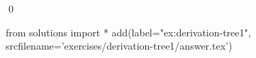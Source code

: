 
\begin{ex} 
  \label{ex:derivation-tree1}
  
  \qed
\end{ex} 
\begin{python0}
from solutions import *
add(label="ex:derivation-tree1",
    srcfilename='exercises/derivation-tree1/answer.tex') 
\end{python0}
